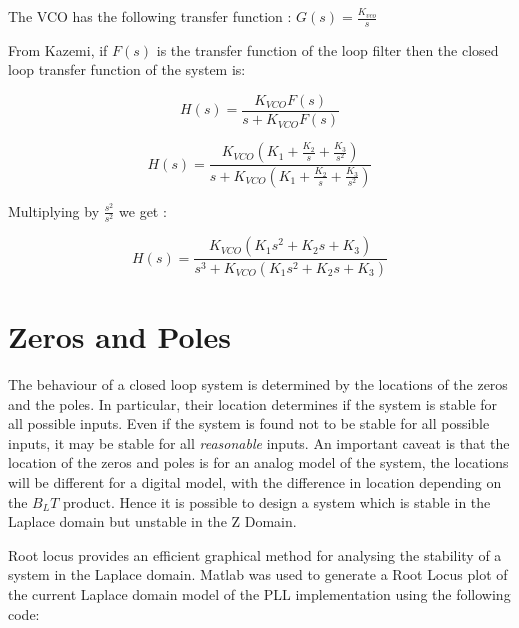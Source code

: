 The \ac{VCO} has the following transfer function : $G(s) = \frac{K_{vco}}{s}$

From Kazemi, if  $F(s)$ is the transfer function of the loop filter\cite{KazemiPHD} then the closed loop transfer function  of the system is: 

\begin{equation}
 H(s) = \frac{K_{VCO}F(s)}{s+K_{VCO}F(s)}
\end{equation}

\begin{equation}
 H(s) = \frac{K_{VCO}(K_1 + \frac{K_2}{s} + \frac{K_3}{s^2})}{s+K_{VCO}(K_1 + \frac{K_2}{s} + \frac{K_3}{s^2})}
\end{equation}

Multiplying by $\frac{s^2}{s^2}$ we get :

\begin{equation}
 H(s) = \frac{K_{VCO}(K_1s^2 + K_2s + K_3)}{s^3+K_{VCO}(K_1s^2 + K_2s + K_3)}
 \end{equation}



\section{Zeros and Poles}
The behaviour of a closed loop system is determined by the locations of the zeros and the poles. In particular, their location determines if the system is stable for all possible inputs. Even if the system is found not to be stable for all possible inputs, it may be stable for all \emph{reasonable} inputs. An important caveat is that the location of the zeros and poles is for an analog model of the system, the locations will be different for a digital model, with the difference in location depending on the $B_LT$ product.  Hence it is possible to design a system which is stable in the Laplace domain but unstable in the Z Domain. 

Root locus provides an efficient graphical method for analysing the stability of a system in the Laplace domain\cite{Nise}. Matlab was used to generate a Root Locus plot of the current Laplace domain model of the \ac{PLL} implementation using the following code:

\begin{comment}
\begin{lstlisting}[frame=single]
Kvco =1;
Bn = 18;
a3 = 1.1;
b3 = 2.4;
omega = Bn/0.7845;
k1 = b3*omega;
k2 = a3*(omega^2);
k3 = omega^3;
%H is the forward transfer function
H = tf([Kvco*k1 Kvco*k2 Kvco*k3],[1 0 0 0]);
rlocus(H);
\end{lstlisting}
\end{comment}


